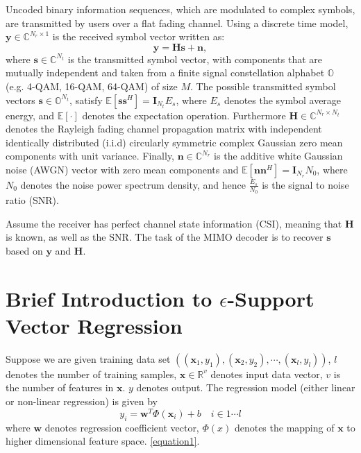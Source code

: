 \documentclass[12pt, draftclsnofoot, onecolumn]{IEEEtran}
\begin{document}
  Uncoded binary information sequences, which are modulated to complex symbols, are transmitted by users over a flat fading channel. Using a discrete time model, $\mathbf{y}\in\mathbb{C}^{N_{r}\times 1}$ is the received symbol vector written as:
\begin{equation}
\mathbf{y}=\mathbf{H}\mathbf{s}+\mathbf{n},   \label{discrete time MIMO system}
\end{equation}
where $\mathbf{s}\in \mathbb{C}^{N_{t}}$ is the transmitted symbol vector, with components that are mutually independent and taken from a finite signal constellation alphabet $\mathbb{O}$ (e.g. 4-QAM, 16-QAM, 64-QAM) of size $M$. The possible transmitted symbol vectors $\mathbf{s}\in \mathbb{O}^{N_{t}}$, satisfy $\mathbb{E}[\mathbf{s}\mathbf{s}^{H}]=\mathbf{I}_{N_t}E_{s}$, where $E_{s}$ denotes the symbol average energy, and $\mathbb{E}[\cdot]$ denotes the expectation operation. Furthermore $\mathbf{H}\in \mathbb{C}^{N_{r}\times N_{t}}$ denotes the Rayleigh fading channel propagation matrix with independent identically distributed (i.i.d) circularly symmetric complex Gaussian zero mean components with unit variance. Finally, $\mathbf{n}\in \mathbb{C}^{N_{r}}$ is the additive white Gaussian noise (AWGN) vector with zero mean components and $\mathbb{E}[\mathbf{n}\mathbf{n}^{H}]=\mathbf{I}_{N_{r}}N_{0}$, where $N_{0}$ denotes the noise power spectrum density, and hence $\frac{E_{s}}{N_{0}}$ is the signal to noise ratio (SNR). 

  Assume the receiver has perfect channel state information (CSI), meaning that $ \mathbf{H}$ is known, as well as the SNR. The task of the MIMO decoder is to recover $\mathbf{s}$ based on $\mathbf{y}$ and $\mathbf{H}$.

\section{Brief Introduction to $\epsilon$-Support Vector Regression}\label{Introduce epsilon SVR}
Suppose we are given training data set $((\mathbf{x}_{1}, y_{1}),(\mathbf{x}_{2},y_{2}),\cdots,(\mathbf{x}_{l},y_{l}))$, $l$ denotes the number of training samples, $\mathbf{x}\in \mathbb{R}^{v}$ denotes input data vector, $v$ is the number of features in $\mathbf{x}$. $y$ denotes output. The regression model (either linear or non-linear regression) is given by 
\begin{equation}
y_{i}=\mathbf{w}^{T}\Phi(\mathbf{x}_{i})+b  \quad i\in 1\cdots l 
\label{equation1}
\end{equation} 
where $\mathbf{w}$ denotes regression coefficient vector, $\Phi(x)$ denotes the mapping of $\mathbf{x}$ to higher dimensional feature space. \ref{equation1}.
\end{document}
